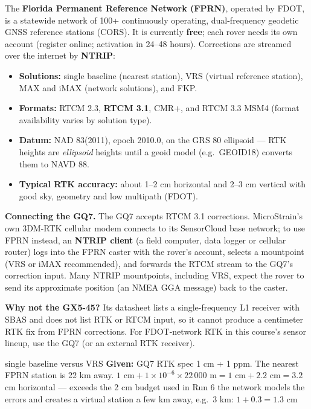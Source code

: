 \begin{eng}
The \textbf{Florida Permanent Reference Network (FPRN)}, operated by FDOT, is a statewide network of 100+ continuously operating, dual-frequency geodetic GNSS reference stations (CORS). It is currently \textbf{free}; each rover needs its own account (register online; activation in 24--48 hours). Corrections are streamed over the internet by \textbf{NTRIP}:
\begin{itemize}
\item \textbf{Solutions:} single baseline (nearest station), VRS (virtual reference station), MAX and iMAX (network solutions), and FKP.
\item \textbf{Formats:} RTCM 2.3, \textbf{RTCM 3.1}, CMR+, and RTCM 3.3 MSM4 (format availability varies by solution type).
\item \textbf{Datum:} NAD 83(2011), epoch 2010.0, on the GRS 80 ellipsoid --- RTK heights are \emph{ellipsoid} heights until a geoid model (e.g.\ GEOID18) converts them to NAVD 88.
\item \textbf{Typical RTK accuracy:} about 1--2 cm horizontal and 2--3 cm vertical with good sky, geometry and low multipath (FDOT).
\end{itemize}
\textbf{Connecting the GQ7.} The GQ7 accepts RTCM 3.1 corrections. MicroStrain's own 3DM-RTK cellular modem connects to its SensorCloud base network; to use FPRN instead, an \textbf{NTRIP client} (a field computer, data logger or cellular router) logs into the FPRN caster with the rover's account, selects a mountpoint (VRS or iMAX recommended), and forwards the RTCM stream to the GQ7's correction input. Many NTRIP mountpoints, including VRS, expect the rover to send its approximate position (an NMEA GGA message) back to the caster.

\textbf{Why not the GX5-45?} Its datasheet lists a single-frequency L1 receiver with SBAS and does not list RTK or RTCM input, so it cannot produce a centimeter RTK fix from FPRN corrections. For FDOT-network RTK in this course's sensor lineup, use the GQ7 (or an external RTK receiver).
\end{eng}

\begin{worked}{single baseline versus VRS}
\textbf{Given:} GQ7 RTK spec 1 cm + 1 ppm. The nearest FPRN station is 22 km away.
 $1\text{ cm}+1\times10^{-6}\times22\,000\text{ m}=1\text{ cm}+2.2\text{ cm}=3.2$ cm horizontal --- exceeds the 2 cm budget used in Run 6
 the network models the errors and creates a virtual station a few km away, e.g.\ 3 km: $1+0.3=1.3$ cm
\end{worked}

